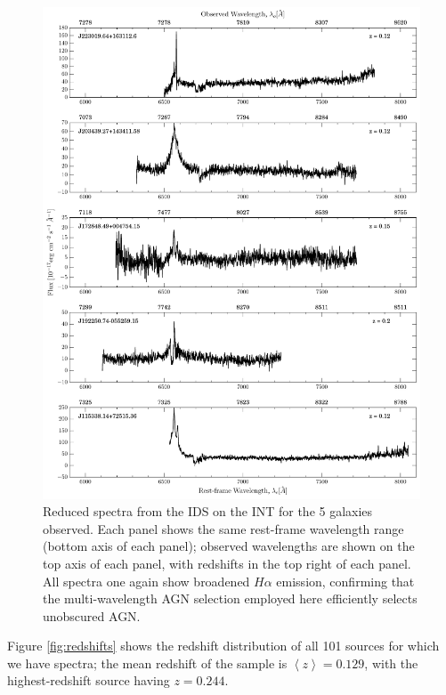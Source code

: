 \begin{figure}
\centering
\includegraphics[height=0.8\textheight]{agn/int_spectra.pdf}
\caption[Optical spectra of 5 \textsc{bulgeless} galaxies observed on the INT with the IDS]{Reduced spectra from the IDS on the INT for the 5 galaxies observed. Each panel shows the same rest-frame wavelength range (bottom axis of each panel); observed wavelengths are shown on the top axis of each panel, with redshifts in the top right of each panel. All spectra one again show broadened $H\alpha$ emission, confirming that the multi-wavelength AGN selection employed here efficiently selects unobscured AGN.}
\label{fig:INTspectra}
\end{figure}


Figure \ref{fig:redshifts} shows the redshift distribution of all 101 sources for which we have spectra; the mean redshift of the sample is $\left< z \right> = 0.129$, with the highest-redshift source having $z = 0.244$. 


